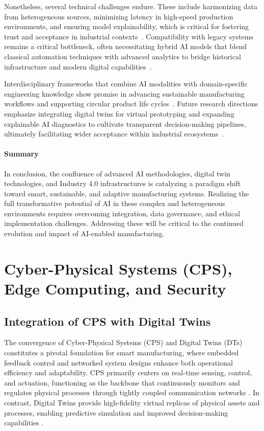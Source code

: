 \documentclass[11pt]{article}
\begin{document}
Nonetheless, several technical challenges endure. These include harmonizing data from heterogeneous sources, minimizing latency in high-speed production environments, and ensuring model explainability, which is critical for fostering trust and acceptance in industrial contexts~\cite{10,42}. Compatibility with legacy systems remains a critical bottleneck, often necessitating hybrid AI models that blend classical automation techniques with advanced analytics to bridge historical infrastructure and modern digital capabilities~\cite{20,36}.  

Interdisciplinary frameworks that combine AI modalities with domain-specific engineering knowledge show promise in advancing sustainable manufacturing workflows and supporting circular product life cycles~\cite{29}. Future research directions emphasize integrating digital twins for virtual prototyping and expanding explainable AI diagnostics to cultivate transparent decision-making pipelines, ultimately facilitating wider acceptance within industrial ecosystems~\cite{38}.

\paragraph{Summary}

In conclusion, the confluence of advanced AI methodologies, digital twin technologies, and Industry 4.0 infrastructures is catalyzing a paradigm shift toward smart, sustainable, and adaptive manufacturing systems. Realizing the full transformative potential of AI in these complex and heterogeneous environments requires overcoming integration, data governance, and ethical implementation challenges. Addressing these will be critical to the continued evolution and impact of AI-enabled manufacturing.


\section{Cyber-Physical Systems (CPS), Edge Computing, and Security}

\subsection{Integration of CPS with Digital Twins}

The convergence of Cyber-Physical Systems (CPS) and Digital Twins (DTs) constitutes a pivotal foundation for smart manufacturing, where embedded feedback control and networked system designs enhance both operational efficiency and adaptability. CPS primarily centers on real-time sensing, control, and actuation, functioning as the backbone that continuously monitors and regulates physical processes through tightly coupled communication networks \cite{ref9}. In contrast, Digital Twins provide high-fidelity virtual replicas of physical assets and processes, enabling predictive simulation and improved decision-making capabilities \cite{ref12}.
\end{document}
